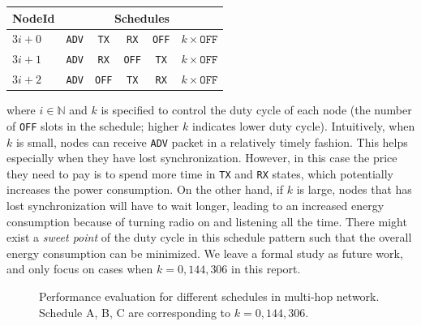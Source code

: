 \begin{tabular}{ l | c | c | c | c | c }
  \hline                       
  NodeId & \multicolumn{5}{c}{Schedules} \\
  \hline
  $3i+0$ & \texttt{ADV} & \texttt{TX} & \texttt{RX} & \texttt{OFF} & $k \times \texttt{OFF}$ \\
  $3i+1$ & \texttt{ADV} & \texttt{RX} & \texttt{OFF} & \texttt{TX} & $k \times \texttt{OFF}$ \\
  $3i+2$ & \texttt{ADV} & \texttt{OFF} & \texttt{TX} & \texttt{RX} & $k \times \texttt{OFF}$ \\
  \hline  
\end{tabular}
where $i \in \mathbb{N}$ and $k$ is specified to control the duty cycle of each node (the number of \texttt{OFF} slots in the schedule; higher $k$ indicates lower duty cycle). Intuitively, when $k$ is small, nodes can receive \texttt{ADV} packet in a relatively timely fashion. This helps especially when they have lost synchronization. However, in this case the price they need to pay is to spend more time in \texttt{TX} and \texttt{RX} states, which potentially increases the power consumption. On the other hand, if $k$ is large, nodes that has lost synchronization will have to wait longer, leading to an increased energy consumption because of turning radio on and listening all the time. There might exist a {\em sweet point} of the duty cycle in this schedule pattern such that the overall energy consumption can be minimized. We leave a formal study as future work, and only focus on cases when $k = 0, 144, 306$ in this report.

\begin{figure}
\hfill
{}
\hfill
{}
\hfill
\caption{Performance evaluation for different schedules in multi-hop network. Schedule A, B, C are corresponding to $k = 0, 144, 306$.}
\label{fig:evaluation}
\end{figure}

